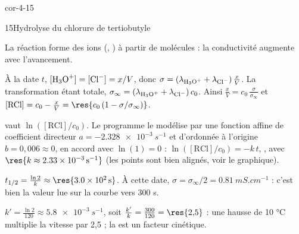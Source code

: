\begin{blocLivre}{cor-4-15}
\begin{corrige}{15}{Hydrolyse du chlorure de tertiobutyle}
\begin{questions}
\item La réaction forme des ions (, ) à partir de molécules : la conductivité augmente avec l'avancement.
\item À la date $t$, $[\ce{H3O+}]=[\ce{Cl-}]=x/V$, donc $\sigma=\left(\lambda_{\ce{H3O+}}+\lambda_{\ce{Cl-}}\right)\frac{x}{V}$.
La transformation étant totale, $\sigma_\infty=\left(\lambda_{\ce{H3O+}}+\lambda_{\ce{Cl-}}\right)c_0$. Ainsi
$\frac{x}{V}=c_0\,\frac{\sigma}{\sigma_\infty}$ et $[\mathrm{RCl}]=c_0-\frac{x}{V}=\res{c_0\left(1-\sigma/\sigma_\infty\right)}$.
\item {} vaut $\ln([\mathrm{RCl}]/c_0)$. Le programme le modélise par une fonction affine de coefficient directeur
$a=\qty{-2,328e-3}{s^{-1}}$ et d'ordonnée à l'origine $b=0{,}006\approx0$, en accord avec $\ln(1)=0$ :
$\ln([\mathrm{RCl}]/c_0)=-k\,t$, , avec $\res{k\approx\qty{2,33e-3}{s^{-1}}}$ (les points
sont bien alignés, voir le graphique).
\item $t_{1/2}=\frac{\ln2}{k}\approx\res{\qty{3,0e2}{s}}$. À cette date, $\sigma=\sigma_\infty/2=\qty{0,81}{mS.cm^{-1}}$ :
c'est bien la valeur lue sur la courbe vers 300 s.
\item $k'=\frac{\ln2}{120}\approx\qty{5,8e-3}{s^{-1}}$, soit $\frac{k'}{k}=\frac{300}{120}=\res{2{,}5}$ : une hausse de
10 °C multiplie la vitesse par 2,5 ; la  est un facteur cinétique.
\end{questions}
\end{corrige}
\end{blocLivre}
